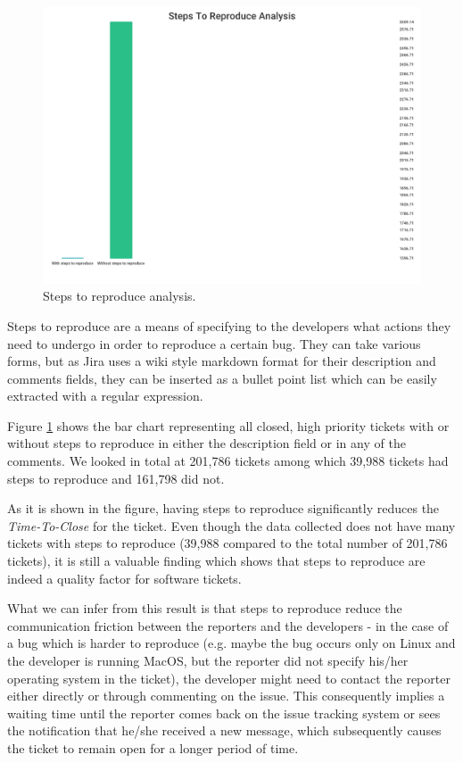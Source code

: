 \documentclass{mpaper}
\begin{document}
\begin{figure}[ht]
  \begin{center}
    \includegraphics[scale=0.18]{images/steps_to_reproduce.png}
  \end{center}
  \caption{\label{steps}Steps to reproduce analysis.}
\end{figure}

Steps to reproduce are a means of specifying to the developers what actions they need to undergo in order 
to reproduce a certain bug. They can take various forms, but as Jira uses a wiki style markdown format for 
their description and comments fields, they can be inserted as a bullet point list which can be easily 
extracted with a regular expression.

Figure \ref{steps} shows the bar chart representing all closed, high priority tickets with or without steps 
to reproduce in either the description field or in any of the comments. We looked in total at 201,786 tickets 
among which 39,988 tickets had steps to reproduce and 161,798 did not.

As it is shown in the figure, having steps to reproduce significantly reduces the \emph{Time-To-Close} 
for the ticket. Even though the data collected does not have many tickets with steps to reproduce 
(39,988 compared to the total number of 201,786 tickets), it is still a valuable finding which shows 
that steps to reproduce are indeed a quality factor for software tickets. 

What we can infer from this result is that steps to reproduce reduce the communication friction between 
the reporters and the developers - in the case of a bug which is harder to reproduce (e.g. maybe the 
bug occurs only on Linux and the developer is running MacOS, but the reporter did not specify his/her 
operating system in the ticket), the developer might need to contact the reporter either directly or 
through commenting on the issue. This consequently implies a waiting time until the reporter comes back on the 
issue tracking system or sees the notification that he/she received a new message, which subsequently causes 
the ticket to remain open for a longer period of time. 
\end{document}
